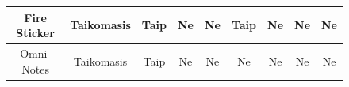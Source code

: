 \begin{figure}[H]
\begin{tabular}{|c|c|c|c|c|c|c|c|c|}
        Fire Sticker                    & Taikomasis                & Taip                          & Ne                            & Ne                         & Taip                       & Ne                 & Ne                 & Ne                  \\ \hline
        Omni-Notes                      & Taikomasis                & Taip                          & Ne                            & Ne                         & Ne                         & Ne                 & Ne                 & Ne                  \\ \hline
    \end{tabular}
\end{figure}